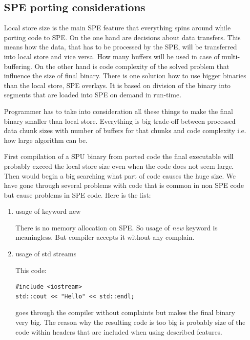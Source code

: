 \subsection {SPE porting considerations}

\par
Local store size is the main SPE feature that everything spins around while porting code to SPE.
On the one hand are decisions about data transfers.
This means how the data, that has to be processed by the SPE, will be transferred into local store and vice versa.
How many buffers will be used in case of multi-buffering.
On the other hand is code complexity of the solved problem that influence the size of final binary.
There is one solution how to use bigger binaries than the local store, SPE overlays.
It is based on division of the binary into segments that are loaded into SPE on demand in run-time.

\par
Programmer has to take into consideration all these things to make the final binary smaller than local store.
Everything is big trade-off between processed data chunk sizes with number of buffers for that chunks and code complexity i.e. how large algorithm can be.

\par
First compilation of a SPU binary from ported code the final executable will probably exceed the local store size even when the code does not seem large.
Then would begin a big searching what part of code causes the huge size.
We have gone through several problems with code that is common in non SPE code but cause problems in SPE code.
Here is the list:
\begin{enumerate}
\item usage of keyword new
\par
There is no memory allocation on SPE. 
So usage of \emph{new} keyword is meaningless.
But compiler accepts it without any complain.

\item usage of std streams
\par
This code:
\begin{verbatim}
#include <iostream>
std::cout << "Hello" << std::endl;
\end{verbatim}
goes through the compiler without complaints but makes the final binary very big.
The reason why the resulting code is too big is probably size of the code within headers that are included when using described features.

\end{enumerate}

